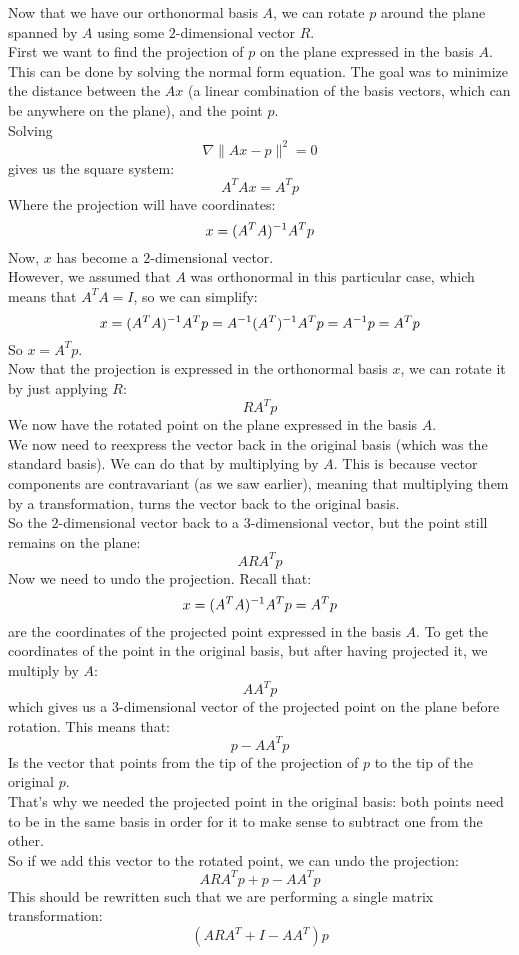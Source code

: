 \documentclass[12pt]{article}
\begin{document}
Now that we have our orthonormal basis $A$,
we can rotate $p$ around the plane
spanned by $A$ using some $2$-dimensional
vector $R$. \\
First we want to find the projection
of $p$ on the plane expressed in the basis $A$.
This can be done by solving the normal
form equation. The goal was to minimize 
the distance between the $Ax$
(a linear combination of the basis vectors, 
which can be anywhere on the plane),
and the point $p$. \\
Solving
\[ \nabla \|Ax - p\|^2 = 0 \]
gives us the square system:
\[ A^TAx = A^Tp \]
Where the projection will have coordinates:
\[ x = (A^TA)^{-1} A^Tp  \]
Now, $x$ has become a $2$-dimensional vector. \\
However, we assumed that $A$
was orthonormal in this particular case,
which means that $A^TA = I$,
so we can simplify:
\[ x = (A^TA)^{-1} A^Tp
= A^{-1}(A^T)^{-1} A^Tp = 
A^{-1} p = A^Tp \]
So $x = A^Tp$. \\
Now that the projection is expressed in
the orthonormal basis $x$,
we can rotate it by just applying $R$:
\[ RA^Tp \]
We now have the rotated point on the plane
expressed in the basis $A$. \\
We now need to reexpress the vector back
in the original basis (which was the standard
basis).
We can do that by multiplying by $A$.
This is because vector components are contravariant
(as we saw earlier),
meaning that multiplying them by a transformation,
turns the vector back to the original basis. \\
So the $2$-dimensional
vector back to a $3$-dimensional vector,
but the point still remains on the plane:
\[ ARA^Tp \]
Now we need to undo the projection. 
Recall that:
\[ x = (A^TA)^{-1} A^Tp = A^Tp \]
are the coordinates of the projected
point expressed in the basis $A$.
To get the coordinates of the point
in the original basis,
but after having projected it,
we multiply by $A$:
\[ AA^Tp \]
which gives us a $3$-dimensional vector
of the projected point on the plane
before rotation.
This means that:
\[ p - AA^Tp \]
Is the vector that points from the 
tip of the projection of $p$ to
the tip of the original $p$. \\
That's why we needed the projected point
in the original basis: both points
need to be in the same basis in order for
it to make sense to subtract one from the other. \\
So if we add this vector to the
rotated point, we can undo the projection:
\[ ARA^Tp + p - AA^Tp \]
This should be rewritten such that
we are performing a single matrix transformation:
\[ (ARA^T + I - AA^T)p \] \\
\end{document}
